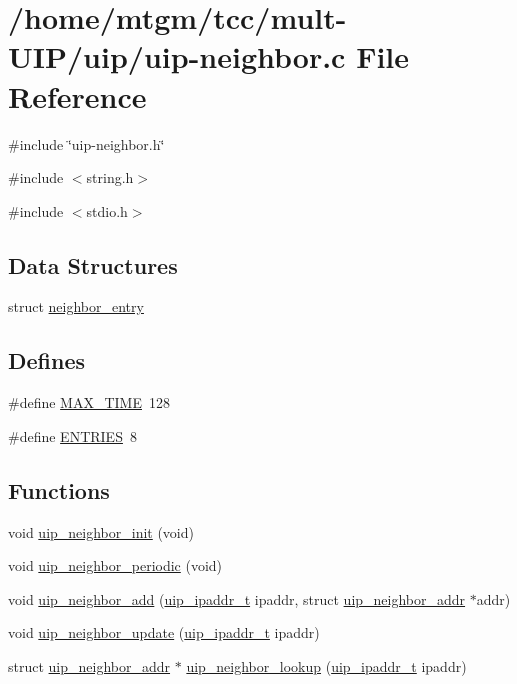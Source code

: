 \hypertarget{uip-neighbor_8c}{
\section{/home/mtgm/tcc/mult-\/UIP/uip/uip-\/neighbor.c File Reference}
\label{uip-neighbor_8c}
}
{\ttfamily \#include \char`\"{}uip-\/neighbor.h\char`\"{}}\par
{\ttfamily \#include $<$string.h$>$}\par
{\ttfamily \#include $<$stdio.h$>$}\par
\subsection*{Data Structures}
\begin{DoxyCompactItemize}
\item 
struct \hyperlink{structneighbor__entry}{neighbor\_\-entry}
\end{DoxyCompactItemize}
\subsection*{Defines}
\begin{DoxyCompactItemize}
\item 
\#define \hyperlink{uip-neighbor_8c_a5320d4457a472d8888ec1905bc0e0a1c}{MAX\_\-TIME}~128
\item 
\#define \hyperlink{uip-neighbor_8c_a5f2e1fcf0055d20ce17664b1027bb9eb}{ENTRIES}~8
\end{DoxyCompactItemize}
\subsection*{Functions}
\begin{DoxyCompactItemize}
\item 
void \hyperlink{uip-neighbor_8c_a1273664aba3e6a2a46e87dcb1a5f19ad}{uip\_\-neighbor\_\-init} (void)
\item 
void \hyperlink{uip-neighbor_8c_a890e822616a6839dfbf51dcb591b8e99}{uip\_\-neighbor\_\-periodic} (void)
\item 
void \hyperlink{uip-neighbor_8c_a88460bea09a462d0e22511cb567eee14}{uip\_\-neighbor\_\-add} (\hyperlink{group__uip_ga1ef35301f43a5bbb9f89f07b5a36b9a0}{uip\_\-ipaddr\_\-t} ipaddr, struct \hyperlink{structuip__neighbor__addr}{uip\_\-neighbor\_\-addr} $\ast$addr)
\item 
void \hyperlink{uip-neighbor_8c_a1d5ce7047650f3ecee0814dbc8714099}{uip\_\-neighbor\_\-update} (\hyperlink{group__uip_ga1ef35301f43a5bbb9f89f07b5a36b9a0}{uip\_\-ipaddr\_\-t} ipaddr)
\item 
struct \hyperlink{structuip__neighbor__addr}{uip\_\-neighbor\_\-addr} $\ast$ \hyperlink{uip-neighbor_8c_a692d80636342d564422ccd9296ad568d}{uip\_\-neighbor\_\-lookup} (\hyperlink{group__uip_ga1ef35301f43a5bbb9f89f07b5a36b9a0}{uip\_\-ipaddr\_\-t} ipaddr)
\end{DoxyCompactItemize}


